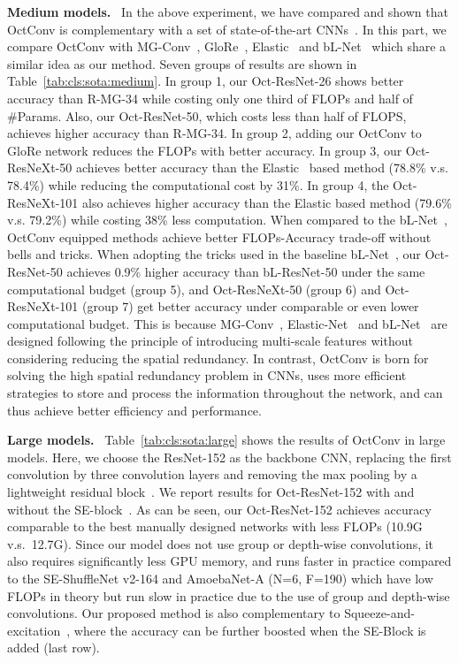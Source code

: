 \documentclass[10pt,twocolumn,letterpaper]{article}
\newcommand{\hiConvPrefix}[0]{Oct\xspace}
\newcommand{\hiConv}[0]{OctConv\xspace}
\newcommand{\myparagraph}[1]{\vspace{1pt}\noindent\textbf{#1.}~}
\begin{document}
\myparagraph{Medium models}
In the above experiment, we have compared and shown that \hiConv is complementary with a set of state-of-the-art CNNs~\cite{ResNetV1,ResNetV2,ResNeXt,densenet,MobileNetV1,MobileNetV2,SENet}. In this part, we compare \hiConv with MG-Conv~\cite{ke2017multigrid}, GloRe~\cite{glorea}, Elastic~\cite{ELASTIC} and bL-Net~\cite{bLNet} which share a similar idea as our method. Seven groups of results are shown in Table~\ref{tab:cls:sota:medium}. In group 1, our \hiConvPrefix-ResNet-26 shows  better accuracy than R-MG-34 while costing only one third of FLOPs and half of \#Params. Also, our \hiConvPrefix-ResNet-50, which costs less than half of FLOPS, achieves  higher accuracy than R-MG-34. In group 2, adding our \hiConv to GloRe network reduces the FLOPs with better accuracy. In group 3, our \hiConvPrefix-ResNeXt-50 achieves better accuracy than the Elastic~\cite{ELASTIC} based method (78.8\% v.s. 78.4\%) while reducing the computational cost by 31\%. In group 4, the \hiConvPrefix-ResNeXt-101 also achieves higher accuracy than the Elastic based method (79.6\% v.s. 79.2\%) while costing 38\% less computation. When compared to the bL-Net~\cite{bLNet}, \hiConv equipped methods achieve better FLOPs-Accuracy trade-off without bells and tricks. When adopting the tricks used in the baseline bL-Net~\cite{bLNet}, our \hiConvPrefix-ResNet-50 achieves 0.9\% higher accuracy than bL-ResNet-50 under the same computational budget (group 5), and \hiConvPrefix-ResNeXt-50 (group 6) and \hiConvPrefix-ResNeXt-101 (group 7) get better accuracy under comparable or even lower computational budget. This is because MG-Conv~\cite{ke2017multigrid}, Elastic-Net~\cite{ELASTIC} and bL-Net~\cite{bLNet} are designed following the principle of introducing multi-scale features without considering reducing the spatial redundancy. In contrast, \hiConv is born for solving the high spatial redundancy problem in CNNs, uses more efficient strategies to store and process the information throughout the network, and can thus achieve better efficiency and performance.


\myparagraph{Large models}
Table~\ref{tab:cls:sota:large} shows the results of \hiConv in large models. Here, we choose the ResNet-152 as the backbone CNN, replacing the first  convolution by three  convolution layers and removing the max pooling by a lightweight residual block~\cite{bLNet}. We report results for \hiConvPrefix-ResNet-152 with and without the SE-block~\cite{SENet}. As can be seen, our \hiConvPrefix-ResNet-152 achieves accuracy comparable to the best manually designed networks with less FLOPs (10.9G v.s.~12.7G). Since our model does not use group or depth-wise convolutions, it also requires significantly less GPU memory, and runs faster in practice compared to the SE-ShuffleNet v2-164 and AmoebaNet-A (N=6, F=190) which have low FLOPs in theory but run slow in practice due to the use of group and depth-wise convolutions. Our proposed method is also complementary to Squeeze-and-excitation~\cite{SENet}, where the accuracy can be further boosted when the SE-Block is added (last row). 
 
\end{document}
